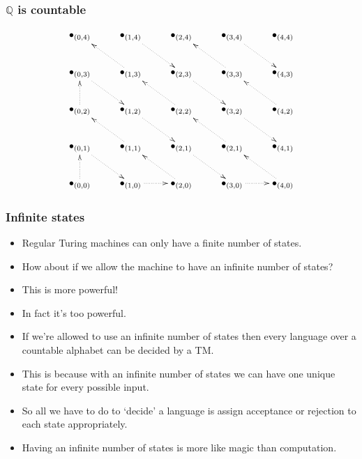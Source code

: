 \documentclass[handout]{beamer}
\begin{document}
\begin{frame}
\frametitle{$\mathbb{Q}$ is countable}
\[\xymatrix{ 
\bullet_{(0,4)} & \bullet_{(1,4)}\ar@{.>}[dr] & \bullet_{(2,4)} & \bullet_{(3,4)}\ar@{.>}[dr] & \bullet_{(4,4)}\\
\bullet_{(0,3)}\ar@{.>}[dr]  & \bullet_{(1,3)}\ar@{.>}[ul] & \bullet_{(2,3)}\ar@{.>}[dr]  & \bullet_{(3,3)}\ar@{.>}[ul] & \bullet_{(4,3)} \\
\bullet_{(0,2)}\ar@{.>}[u]  & \bullet_{(1,2)}\ar@{.>}[dr]  & \bullet_{(2,2)}\ar@{.>}[ul] & \bullet_{(3,2)}\ar@{.>}[dr]  & \bullet_{(4,2)}\ar@{.>}[ul]  \\
\bullet_{(0,1)}\ar@{.>}[dr]  & \bullet_{(1,1)}\ar@{.>}[ul]  & \bullet_{(2,1)}\ar@{.>}[dr]  & \bullet_{(2,1)}\ar@{.>}[ul] & \bullet_{(4,1)} \\
\bullet_{(0,0)}\ar@{.>}[u] & \bullet_{(1,0)}\ar@{.>}[r]  & \bullet_{(2,0)}\ar@{.>}[ul] & \bullet_{(3,0)}\ar@{.>}[r]  & \bullet_{(4,0)}\ar@{.>}[ul]  }\]
\end{frame}

\begin{frame}
\frametitle{Infinite states}
\begin{itemize}
\item Regular Turing machines can only have a finite number of states.
\vspace{0.1cm} 
\item How about if we allow the machine to have an infinite number of states? 
\vspace{0.1cm}
\item This is more powerful! 
\vspace{0.1cm}
\item In fact it's too powerful. 
\vspace{0.1cm}
\item If we're allowed to use an infinite number of states then every language over a countable alphabet can be decided by a TM. 
\vspace{0.1cm}
\item This is because with an infinite number of states we can have one unique state for every possible input. 
\vspace{0.1cm}
\item So all we have to do to `decide' a language is assign acceptance or rejection to each state appropriately. 
\vspace{0.1cm}
\item Having an infinite number of states is more like magic than computation.  
\end{itemize}

\end{frame}
\end{document}
